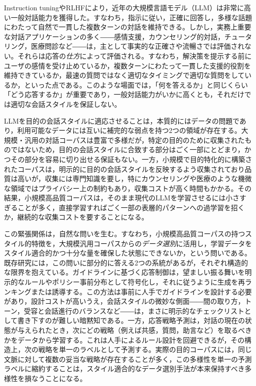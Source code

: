 \documentclass[manuscript,review,anonymous]{acmart}
\begin{document}
Instruction tuningやRLHFにより，近年の大規模言語モデル（LLM）は非常に高い一般対話能力を獲得した。すなわち，指示に従い，正確に回答し，多様な話題にわたって自然で一貫した複数ターンの対話を維持できる\cite{ouyang2022instructgpt}。しかし，実務上重要な対話アプリケーションの多く――感情支援，カウンセリング的対話，チュータリング，医療問診など――は，主として事実的な正確さや流暢さでは評価されない。それらは応答の\emph{仕方}によって評価される。すなわち，解決策を提示する前にユーザの感情を受け止めているか，複数ターンにわたって一貫した支援的役割を維持できているか，最速の質問ではなく適切なタイミングで適切な質問をしているか，といった点である\cite{rashkin2019empathetic,liu2021esconv}。このような場面では，「何を答えるか」と同じくらい「どう応答するか」が重要であり，一般対話能力がいかに高くとも，それだけでは適切な会話スタイルを保証しない。

LLMを目的の会話スタイルに適応させることは，本質的にはデータの問題であり，利用可能なデータには互いに補完的な弱点を持つ2つの領域が存在する。大規模・汎用の対話コーパスは豊富で多様だが，特定の目的のために収集されたものではないため，目的の会話スタイルに合致する部分はごく一部にとどまり，かつその部分を容易に切り出せる保証もない。一方，小規模で目的特化的に構築されたコーパスは，明示的に目的の会話スタイルを反映するよう収集されており品質は高いが，収集には専門知識を要し，特にカウンセリングや医療のような機微な領域ではプライバシー上の制約もあり，収集コストが高く時間もかかる\cite{zhou2023lima,zhang2025datasurvey}。その結果，小規模高品質コーパスは，そのまま現代のLLMを学習させるには小さすぎることが多く，直接学習すればごく一部の表層的パターンへの過学習を招くか，継続的な収集コストを要することになる。

この緊張関係は，自然な問いを生む。すなわち，小規模高品質コーパスの持つスタイル的特徴を，大規模汎用コーパスからの\emph{データ選別}に活用し，学習データをスタイル適合的かつ十分な量を確保した状態にできないか，という問いである。既存研究には，この問いに部分的に答える2つの系統があるが，それぞれ構造的な限界を抱えている。ガイドラインに基づく応答制御は，望ましい振る舞いを明示的なルールやポリシー事前分布として符号化し，それに従うように生成を再ランキングまたは誘導する\cite{wen2025guidedtod}。この方法は事前に人手でガイドラインを設計する必要があり，設計コストが高いうえ，会話スタイルの微妙な側面――間の取り方，トーン，受容と会話進行のバランスなど――は，まさに明示的なチェックリストとして書き下すのが難しい暗黙知である。一方，応答戦略予測は，対話の現在の状態が与えられたとき，次にどの戦略（例えば共感，質問，助言など）を取るべきかをデータから学習する\cite{wan2025emodynamix}。これは人手によるルール設計を回避できるが，その構造上，次の戦略を単一のラベルとして予測する。実際の目的コーパスには，同じ文脈に対して複数の妥当な戦略が存在することが多く，この多様性を単一の予測ラベルに縮約することは，スタイル適合的なデータ選別手法が本来保持すべき多様性を損なうことになる。
\end{document}
